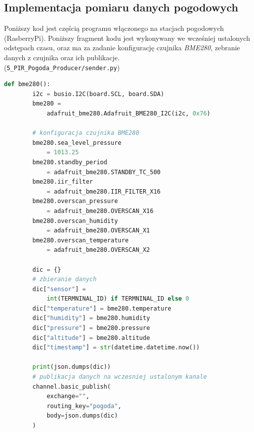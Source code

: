 \documentclass[12pt,a4paper]{article}
\begin{document}
    \pagebreak
    \subsection{Implementacja pomiaru danych pogodowych}
    Poniższy kod jest częścią programu włączonego na stacjach pogodowych (RasberryPi). Poniższy fragment kodu jest wykonywany we wcześniej ustalonych odstępach czasu, oraz ma za zadanie konfigurację czujnika \emph{BME280}, zebranie danych z czujnika oraz ich publikacje.\\(\texttt{5\_PIR\_Pogoda\_Producer/sender.py})
    \begin{lstlisting}[language=Python]
    def bme280():
        i2c = busio.I2C(board.SCL, board.SDA)
        bme280 =
            adafruit_bme280.Adafruit_BME280_I2C(i2c, 0x76)

        # konfiguracja czujnika BME280
        bme280.sea_level_pressure
            = 1013.25
        bme280.standby_period
            = adafruit_bme280.STANDBY_TC_500
        bme280.iir_filter
            = adafruit_bme280.IIR_FILTER_X16
        bme280.overscan_pressure
            = adafruit_bme280.OVERSCAN_X16
        bme280.overscan_humidity
            = adafruit_bme280.OVERSCAN_X1
        bme280.overscan_temperature
            = adafruit_bme280.OVERSCAN_X2

        dic = {}
        # zbieranie danych
        dic["sensor"] =
            int(TERMNINAL_ID) if TERMNINAL_ID else 0
        dic["temperature"] = bme280.temperature
        dic["humidity"] = bme280.humidity
        dic["pressure"] = bme280.pressure
        dic["altitude"] = bme280.altitude
        dic["timestamp"] = str(datetime.datetime.now())

        print(json.dumps(dic))
        # publikacja danych na wczesniej ustalonym kanale
        channel.basic_publish(
            exchange="",
            routing_key="pogoda",
            body=json.dumps(dic)
        )
    \end{lstlisting}
\end{document}
